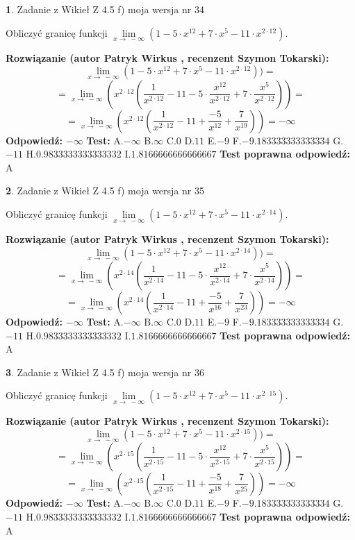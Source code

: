 \documentclass[12pt, a4paper]{article}
\theoremstyle{definition} %
\newtheorem{zad}{}
\newcommand{\zadStart}[1]{\begin{zad}#1\newline}
\newcommand{\zadStop}{\end{zad}}
\newcommand{\rozwStart}[2]{\noindent \textbf{Rozwiązanie (autor #1 , recenzent #2): }\newline}
\newcommand{\rozwStop}{\newline}
\newcommand{\odpStart}{\noindent \textbf{Odpowiedź:}\newline}
\newcommand{\odpStop}{\newline}
\newcommand{\testStart}{\noindent \textbf{Test:}\newline}
\newcommand{\testStop}{\newline}
\newcommand{\kluczStart}{\noindent \textbf{Test poprawna odpowiedź:}\newline}
\newcommand{\kluczStop}{\newline}
\begin{document}
\zadStart{Zadanie z Wikieł Z 4.5 f) moja wersja nr 34}


Obliczyć granicę funkcji  $\lim\limits_{x\to\ -\infty}(1 - 5 \cdot x^{12}+7 \cdot x^{5}- 11 \cdot x^{2\cdot12})$.
\zadStop
\rozwStart{Patryk Wirkus}{Szymon Tokarski}
$$\lim\limits_{x\to\ -\infty}(1 - 5 \cdot x^{12}+7 \cdot x^{5}- 11 \cdot x^{2\cdot12}))=$$
$$=\lim\limits_{x\to\ -\infty}(x^{2\cdot12}(\frac{1}{x^{2\cdot12}}-11 -5 \cdot \frac{x^{12}}{x^{2\cdot12}}+7 \cdot \frac{x^{5}}{x^{2\cdot12}}))=$$
$$=\lim\limits_{x\to\ -\infty}(x^{2\cdot12}(\frac{1}{x^{2\cdot12}}-11 + \frac{-5}{x^{12}}+ \frac{7}{x^{19}}))=-\infty$$
\rozwStop
\odpStart
$-\infty$
\odpStop
\testStart
A.$-\infty$ B.$\infty$ C.$0$ D.$11$ E.$-9$
F.$-9.183333333333334$ G.$-11$
H.$0.9833333333333332$
I.$1.8166666666666667$
\testStop
\kluczStart
A
\kluczStop



\zadStart{Zadanie z Wikieł Z 4.5 f) moja wersja nr 35}


Obliczyć granicę funkcji  $\lim\limits_{x\to\ -\infty}(1 - 5 \cdot x^{12}+7 \cdot x^{5}- 11 \cdot x^{2\cdot14})$.
\zadStop
\rozwStart{Patryk Wirkus}{Szymon Tokarski}
$$\lim\limits_{x\to\ -\infty}(1 - 5 \cdot x^{12}+7 \cdot x^{5}- 11 \cdot x^{2\cdot14}))=$$
$$=\lim\limits_{x\to\ -\infty}(x^{2\cdot14}(\frac{1}{x^{2\cdot14}}-11 -5 \cdot \frac{x^{12}}{x^{2\cdot14}}+7 \cdot \frac{x^{5}}{x^{2\cdot14}}))=$$
$$=\lim\limits_{x\to\ -\infty}(x^{2\cdot14}(\frac{1}{x^{2\cdot14}}-11 + \frac{-5}{x^{16}}+ \frac{7}{x^{23}}))=-\infty$$
\rozwStop
\odpStart
$-\infty$
\odpStop
\testStart
A.$-\infty$ B.$\infty$ C.$0$ D.$11$ E.$-9$
F.$-9.183333333333334$ G.$-11$
H.$0.9833333333333332$
I.$1.8166666666666667$
\testStop
\kluczStart
A
\kluczStop



\zadStart{Zadanie z Wikieł Z 4.5 f) moja wersja nr 36}


Obliczyć granicę funkcji  $\lim\limits_{x\to\ -\infty}(1 - 5 \cdot x^{12}+7 \cdot x^{5}- 11 \cdot x^{2\cdot15})$.
\zadStop
\rozwStart{Patryk Wirkus}{Szymon Tokarski}
$$\lim\limits_{x\to\ -\infty}(1 - 5 \cdot x^{12}+7 \cdot x^{5}- 11 \cdot x^{2\cdot15}))=$$
$$=\lim\limits_{x\to\ -\infty}(x^{2\cdot15}(\frac{1}{x^{2\cdot15}}-11 -5 \cdot \frac{x^{12}}{x^{2\cdot15}}+7 \cdot \frac{x^{5}}{x^{2\cdot15}}))=$$
$$=\lim\limits_{x\to\ -\infty}(x^{2\cdot15}(\frac{1}{x^{2\cdot15}}-11 + \frac{-5}{x^{18}}+ \frac{7}{x^{25}}))=-\infty$$
\rozwStop
\odpStart
$-\infty$
\odpStop
\testStart
A.$-\infty$ B.$\infty$ C.$0$ D.$11$ E.$-9$
F.$-9.183333333333334$ G.$-11$
H.$0.9833333333333332$
I.$1.8166666666666667$
\testStop
\kluczStart
A
\kluczStop
\end{document}
